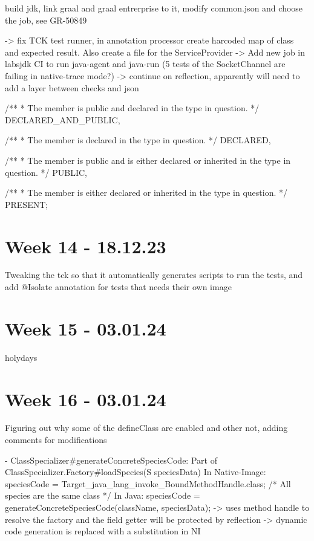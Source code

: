 build jdk, link graal and graal entrerprise to it, modify common.json and choose the job, see GR-50849

-> fix TCK test runner, in annotation processor create harcoded map of class and expected result. Also create a file for the ServiceProvider
-> Add new job in labsjdk CI to run java-agent and java-run (5 tests of the SocketChannel are failing in native-trace mode?)
-> continue on reflection, apparently will need to add a layer between checks and json

        /**
         * The member is public and declared in the type in question.
         */
        DECLARED\_AND\_PUBLIC,

        /**
         * The member is declared in the type in question.
         */
        DECLARED,

        /**
         * The member is public and is either declared or inherited in the type in question.
         */
        PUBLIC,

        /**
         * The member is either declared or inherited in the type in question.
         */
        PRESENT;

\section{Week 14 - 18.12.23}
Tweaking the tck so that it automatically generates scripts to run the tests, and add @Isolate annotation for tests that needs their own image

\section{Week 15 - 03.01.24}
holydays
\section{Week 16 - 03.01.24}
Figuring out why some of the defineClass are enabled and other not, adding comments for modifications

- ClassSpecializer#generateConcreteSpeciesCode:
Part of ClassSpecializer.Factory#loadSpecies(S speciesData)
In Native-Image: speciesCode = Target_java_lang_invoke_BoundMethodHandle.class; /* All species are the same class */
In Java: speciesCode = generateConcreteSpeciesCode(className, speciesData); -> uses method handle to resolve the factory and the field getter
will be protected by reflection
-> dynamic code generation is replaced with a substitution in NI

